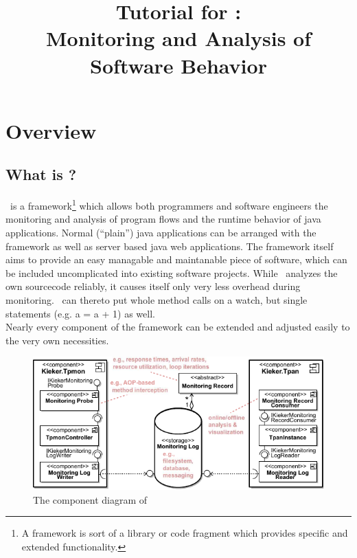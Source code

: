\documentclass[a4paper, oneside, 11pt]{scrartcl}
\title{Tutorial for \Kieker:\\ Monitoring and Analysis of Software Behavior}
\begin{document}
  \maketitle
  \tableofcontents
  \newpage

  \section{Overview}
    \subsection{What is \Kieker?}
      \Kieker\ is a framework\footnote{A framework is sort of a library or code fragment which provides specific and extended functionality.} which allows both programmers and software engineers the monitoring and analysis of program flows and the runtime behavior of java applications. Normal (``plain'') java applications can be arranged with the framework as well as server based java web applications. The framework itself aims to provide an easy managable and maintanable piece of software, which can be included uncomplicated into existing software projects. While \Kieker\ analyzes the own sourcecode reliably, it causes itself only very less overhead during monitoring. \Kieker\ can thereto put whole method calls on a watch, but single statements (e.g. a = a + 1) as well.\\
      Nearly every component of the framework can be extended and adjusted easily to the very own necessities.
      \begin{figure}[H]
	\begin{center}
	  \includegraphics[width=1.0\textwidth]{kiekerComponentDiagram.pdf}
	  \caption{The component diagram of \Kieker}
          \label{image:kiekercomponentdiagram}
	\end{center}
      \end{figure}
\end{document}
